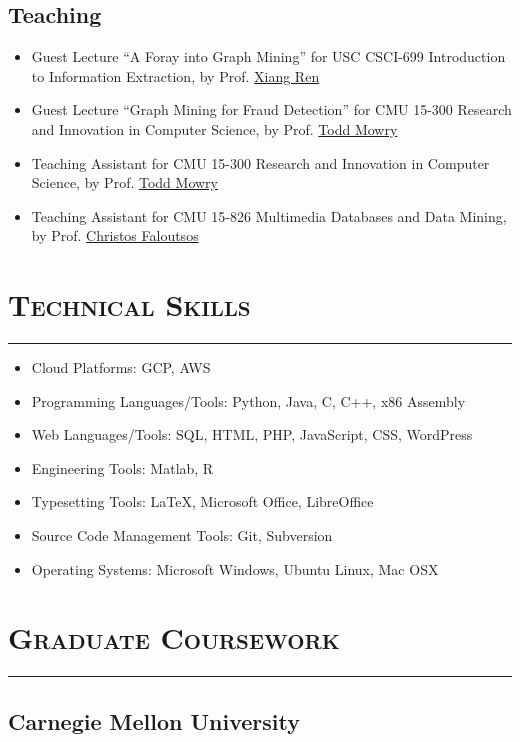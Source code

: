 \documentclass{article}
\newcommand{\HRule}{\rule{\linewidth}{0.5mm}}
\begin{document}
\subsection*{\bf {Teaching}}
\begin{itemize}
\item Guest Lecture ``A Foray into Graph Mining'' for USC CSCI-699 Introduction to Information Extraction, by Prof. \href{http://ink-ron.usc.edu/xiangren/}{Xiang Ren}
\item Guest Lecture ``Graph Mining for Fraud Detection'' for CMU 15-300 Research and Innovation in Computer Science, by Prof. \href{http://www.cs.cmu.edu/~tcm}{Todd Mowry}
\item Teaching Assistant for CMU 15-300 Research and Innovation in Computer Science, by Prof. \href{http://www.cs.cmu.edu/~tcm}{Todd Mowry}
\item Teaching Assistant for CMU 15-826 Multimedia Databases and Data Mining, by Prof. \href{http://www.cs.cmu.edu/~christos}{Christos Faloutsos}
\end{itemize}

\section*{\bf \textsc{Technical Skills}}
\vspace{-5mm}\HRule
\begin{itemize}
\item Cloud Platforms: GCP, AWS
\item Programming Languages/Tools: Python, Java, C, C++, x86 Assembly
\item Web Languages/Tools: SQL, HTML, PHP, JavaScript, CSS, WordPress
\item Engineering Tools: Matlab, R
\item Typesetting Tools: \LaTeX, Microsoft Office, LibreOffice
\item Source Code Management Tools: Git, Subversion
\item Operating Systems: Microsoft Windows, Ubuntu Linux, Mac OSX
\end{itemize}

\section*{\bf \textsc{Graduate Coursework}}
\vspace{-5mm}\HRule
\subsection*{\bf {Carnegie Mellon University}}
\end{document}
